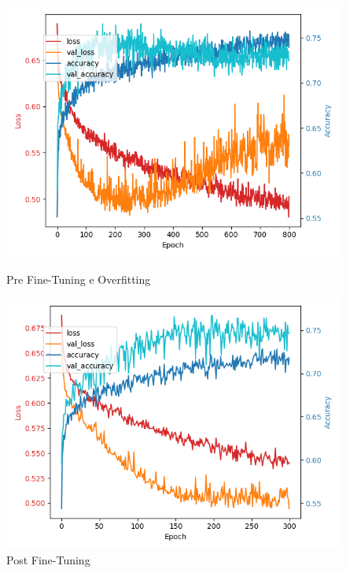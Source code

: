\documentclass[a4paper]{article}
\numberwithin{equation}{section}
\begin{document}
\begin{figure}[H]
    \centering
    \begin{minipage}[b]{0.45\linewidth}
        \centering
        \includegraphics[width=\linewidth]{img/final800.png}
        \caption{Pre Fine-Tuning e Overfitting}
        \label{fig:first_label}
    \end{minipage}
    \hspace{0.05\linewidth}
    \begin{minipage}[b]{0.45\linewidth}
        \centering
        \includegraphics[width=\linewidth]{img/final_mlp.png}
        \caption{Post Fine-Tuning}
        \label{fig:second_label}
    \end{minipage}
\end{figure}
\end{document}
